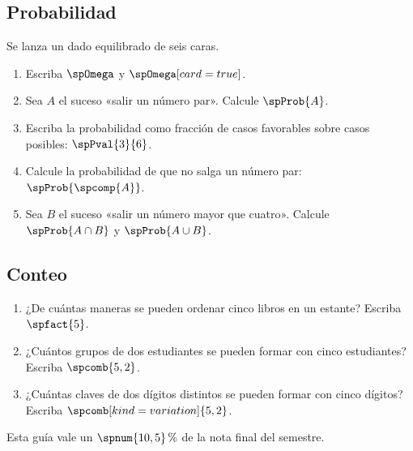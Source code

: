 \documentclass{article}
\begin{document}
\subsection*{Probabilidad}

Se lanza un dado equilibrado de seis caras.

\begin{enumerate}
  \item Escriba $\spOmega$ y $\spOmega[card=true]$.
  \item Sea $A$ el suceso «salir un número par». Calcule $\spProb{A}$.
  \item Escriba la probabilidad como fracción de casos favorables sobre casos posibles: $\spPval{3}{6}$.
  \item Calcule la probabilidad de que no salga un número par: $\spProb{\spcomp{A}}$.
  \item Sea $B$ el suceso «salir un número mayor que cuatro». Calcule $\spProb{A \cap B}$ y $\spProb{A \cup B}$.
\end{enumerate}

\subsection*{Conteo}

\begin{enumerate}
  \item ¿De cuántas maneras se pueden ordenar cinco libros en un estante? Escriba $\spfact{5}$.
  \item ¿Cuántos grupos de dos estudiantes se pueden formar con cinco estudiantes? Escriba $\spcomb{5,2}$.
  \item ¿Cuántas claves de dos dígitos distintos se pueden formar con cinco dígitos? Escriba $\spcomb[kind=variation]{5,2}$.
\end{enumerate}

Esta guía vale un $\spnum{10,5}\,{\%}$ de la nota final del semestre.
\end{document}
